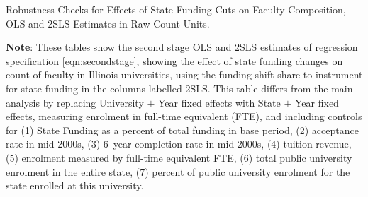 \begin{table}[H]
    \singlespacing
    \centering
    \caption{Robustness Checks for Effects of State Funding Cuts on Faculty Composition, OLS and 2SLS Estimates in Raw Count Units.}
    \makebox[\textwidth][c]{
        \small
        }
    \label{tab:facultycount-rawcount-robustness-checks}
    \justify
    \footnotesize
    \textbf{Note}:
    These tables show the second stage OLS and 2SLS estimates of regression specification \eqref{eqn:secondstage}, showing the effect of state funding changes on count of faculty in Illinois universities, using the funding shift-share to instrument for state funding in the columns labelled 2SLS.
    This table differs from the main analysis by replacing University $+$ Year fixed effects with State $+$ Year fixed effects, measuring enrolment in full-time equivalent (FTE), and including controls for (1)
    State Funding as a percent of total funding in base period, (2) acceptance rate in mid-2000s, (3) 6--year completion rate in mid-2000s, (4) tuition revenue, (5) enrolment measured by full-time equivalent FTE, (6) total public university enrolment in the entire state, (7) percent of public university enrolment for the state enrolled at this university.
\end{table}

